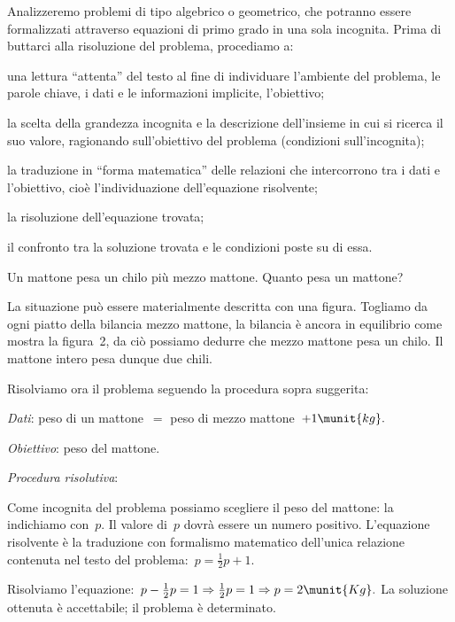 Analizzeremo problemi di tipo algebrico o geometrico, che potranno
essere formalizzati attraverso equazioni di primo grado in una sola
incognita. Prima di buttarci alla risoluzione del problema, procediamo
a:

\begin{enumeratea}
\item una lettura ``attenta'' del
testo al fine di individuare l'ambiente del problema,
le parole chiave, i dati e le informazioni implicite,
l'obiettivo;
\item la scelta della grandezza incognita e la descrizione
dell'insieme in cui si ricerca il suo valore,
ragionando sull'obiettivo del problema (condizioni sull'incognita);
\item la traduzione in ``forma matematica'' delle relazioni che intercorrono tra 
i
dati e l'obiettivo, cioè l'individuazione dell'equazione risolvente;
\item la risoluzione dell'equazione trovata;
\item il confronto tra la soluzione trovata e le condizioni poste su di essa.
\end{enumeratea}

\begin{problema}{}{}
 Un mattone pesa un chilo più mezzo mattone. Quanto pesa un mattone?
\end{problema}

\begin{soluzione}
 La situazione può essere materialmente descritta con una figura.
Togliamo da ogni piatto della bilancia mezzo mattone, la bilancia è
ancora in equilibrio come mostra la figura~2, da ciò possiamo
dedurre che mezzo mattone pesa un chilo. Il mattone intero pesa dunque
due chili.
\begin{center}
 
\end{center}

Risolviamo ora il problema seguendo la procedura sopra suggerita:

\emph{Dati}: peso di un mattone~\(=\) peso di mezzo mattone~\(+ 1\munit{kg}.\)

\emph{Obiettivo}: peso del mattone.

\emph{Procedura risolutiva}:

Come incognita del problema possiamo scegliere il peso del mattone: la
indichiamo con~\(p\).
Il valore di~\(p\) dovrà essere un numero positivo.
L'equazione risolvente è la traduzione con formalismo
matematico dell'unica relazione contenuta nel testo del
problema:~\(p=\frac{1}{2}p+1\).

Risolviamo l'equazione:~\(p-\frac{1}{2}p=1\Rightarrow\frac{1}{2}p=1\Rightarrow 
p=2\munit{Kg}.\)
La soluzione ottenuta è accettabile; il problema è determinato.
\end{soluzione}

